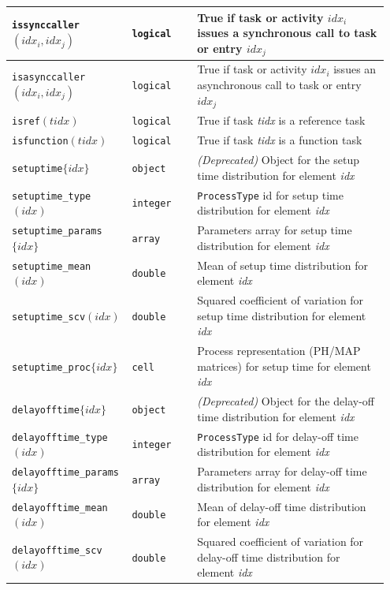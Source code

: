 \begin{MATLAB}
{\begin{longtable}{|p{0.28\linewidth}|p{0.17\linewidth}|p{0.50\linewidth}|}
\texttt{issynccaller}$(idx_i,idx_j)$ &  \texttt{logical} &True if task or activity ${idx_i}$ issues a synchronous call to task or entry ${idx_j}$ \\\hline
\texttt{isasynccaller}$(idx_i,idx_j)$ &  \texttt{logical} &True if task or activity ${idx_i}$ issues an asynchronous call to task or entry ${idx_j}$ \\\hline
\texttt{isref}$(tidx)$ &  \texttt{logical} &True if task \textit{tidx} is a reference task\\\hline
\texttt{isfunction}$(tidx)$ &  \texttt{logical} &True if task \textit{tidx} is a function task\\\hline
\texttt{setuptime}$\{idx\}$ & \texttt{object} & \textit{(Deprecated)} Object for the setup time distribution for element \textit{idx} \\\hline
\texttt{setuptime\_type}$(idx)$ & \texttt{integer} & \texttt{ProcessType} id for setup time distribution for element \textit{idx} \\\hline
\texttt{setuptime\_params}$\{idx\}$ & \texttt{array} & Parameters array for setup time distribution for element \textit{idx} \\\hline
\texttt{setuptime\_mean}$(idx)$ & \texttt{double} & Mean of setup time distribution for element \textit{idx} \\\hline
\texttt{setuptime\_scv}$(idx)$ & \texttt{double} & Squared coefficient of variation for setup time distribution for element \textit{idx} \\\hline
\texttt{setuptime\_proc}$\{idx\}$ & \texttt{cell} & Process representation (PH/MAP matrices) for setup time for element \textit{idx} \\\hline
\texttt{delayofftime}$\{idx\}$ & \texttt{object} & \textit{(Deprecated)} Object for the delay-off time distribution for element \textit{idx} \\\hline
\texttt{delayofftime\_type}$(idx)$ & \texttt{integer} & \texttt{ProcessType} id for delay-off time distribution for element \textit{idx} \\\hline
\texttt{delayofftime\_params}$\{idx\}$ & \texttt{array} & Parameters array for delay-off time distribution for element \textit{idx} \\\hline
\texttt{delayofftime\_mean}$(idx)$ & \texttt{double} & Mean of delay-off time distribution for element \textit{idx} \\\hline
\texttt{delayofftime\_scv}$(idx)$ & \texttt{double} & Squared coefficient of variation for delay-off time distribution for element \textit{idx} \\\hline

\end{longtable}}
\end{MATLAB}
